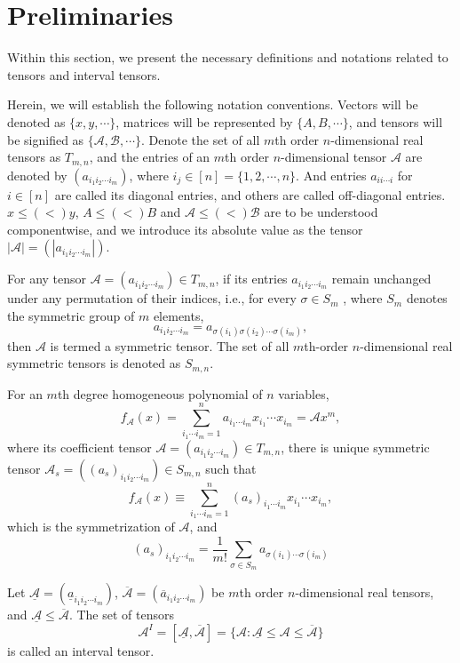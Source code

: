 \documentclass[twoside]{article}
\begin{document}
\section{Preliminaries}
\setcounter{section}{2}

Within this section, we present the necessary definitions and notations related to tensors and interval tensors.

Herein, we will establish the following notation conventions. Vectors will be denoted as $\{x, y, \cdots \}$, matrices will be represented by $\{A, B, \cdots \}$, and tensors will be signified as $\{\mathcal{A}, \mathcal{B}, \cdots \}$. Denote the set of all $m$th order $n$-dimensional real tensors as $T_{m,n}$, and the entries of an $m$th order $n$-dimensional tensor $\mathcal{A}$ are denoted by $(a_{i_1i_2\cdots i_m})$, where $i_j\in[n]=\{1,2,\cdots,n\}$. And entries $a_{ii\cdots i}$ for $i\in[n]$ are called its diagonal entries, and others are called off-diagonal entries. $x\leq(<) y$, $A\leq(<) B$ and $\mathcal{A}\leq(<) \mathcal{B}$ are to be understood componentwise, and we introduce its absolute value as the tensor $|\mathcal{A}|=(|a_{i_1i_2\cdots i_m}|)$.

For any tensor $\mathcal{A} = (a_{i_1i_2\cdots i_m})\in T_{m,n}$, if its entries $a_{i_1i_2\cdots i_m}$ remain unchanged under any permutation of their indices, i.e., for every $\sigma \in S_m$ , where $S_m$ denotes the symmetric group of $m$ elements,
 $$a_{i_1 i_2 \cdots i_m} = a_{\sigma(i_1) \sigma(i_2) \cdots \sigma(i_m)},$$
then $\mathcal{A}$ is termed a symmetric tensor. The set of all $m$th-order $n$-dimensional real symmetric tensors is denoted as $S_{m,n}$.

For an $m$th degree homogeneous polynomial of $n$ variables,
$$f_{\mathcal{A}}(x)=\sum_{i_1\cdots i_m=1}^na_{i_1\cdots i_m}x_{i_1}\cdots x_{i_m}={\mathcal{A}} x^m,$$
where its coefficient tensor $\mathcal{A} = (a_{i_1i_2\cdots i_m})\in T_{m,n}$, there is unique symmetric tensor $\mathcal{A}_s = ((a_s)_{i_1i_2\cdots i_m})\in S_{m,n}$ such that
$$f_{\mathcal{A}}(x)\equiv\sum_{i_1\cdots i_m=1}^n(a_s)_{i_1\cdots i_m}x_{i_1}\cdots x_{i_m},$$
which is the symmetrization of $\mathcal{A}$, and
$$(a_s)_{i_1i_2\cdots i_m}=\frac{1}{m!}\sum_{\sigma \in S_m} a_{\sigma(i_1)\cdots \sigma(i_m)}$$

Let $\underline{\mathcal{A}}=(\underline{a}_{i_1i_2\cdots i_m})$, $\overline{\mathcal{A}}=(\overline{a}_{i_1i_2\cdots i_m})$ be $m$th order $n$-dimensional real tensors, and $\underline{\mathcal{A}}\leq\overline{\mathcal{A}}$. The set of tensors
$$\mathcal{A}^I=[\underline{\mathcal{A}},\overline{\mathcal{A}}]= \{\mathcal{A}:\underline{\mathcal{A}}\leq \mathcal{A}\leq \overline{\mathcal{A}}\}$$
is called an interval tensor.
\end{document}
